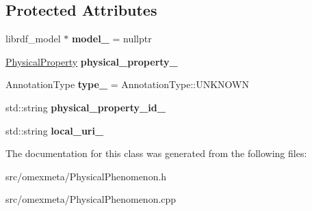 \subsection*{Protected Attributes}
\begin{DoxyCompactItemize}
\item 
\mbox{\label{classomexmeta_1_1PhysicalPhenomenon_a9de43fc3fd94d3463c7fb9b8f684e78b}} 
librdf\+\_\+model $\ast$ {\bfseries model\+\_\+} = nullptr
\item 
\mbox{\label{classomexmeta_1_1PhysicalPhenomenon_a9e17807d60d9e3f797d6c02ef85cdfc6}} 
\hyperlink{classomexmeta_1_1PhysicalProperty}{Physical\+Property} {\bfseries physical\+\_\+property\+\_\+}
\item 
\mbox{\label{classomexmeta_1_1PhysicalPhenomenon_a74e88adb2099099e411b55cb9aa460a0}} 
Annotation\+Type {\bfseries type\+\_\+} = Annotation\+Type\+::\+U\+N\+K\+N\+O\+WN
\item 
\mbox{\label{classomexmeta_1_1PhysicalPhenomenon_a41e8364977eea6d963a82f0f8088cb9a}} 
std\+::string {\bfseries physical\+\_\+property\+\_\+id\+\_\+}
\item 
\mbox{\label{classomexmeta_1_1PhysicalPhenomenon_a114864dfae1f79ce4e3f430b7711516c}} 
std\+::string {\bfseries local\+\_\+uri\+\_\+}
\end{DoxyCompactItemize}


The documentation for this class was generated from the following files\+:\begin{DoxyCompactItemize}
\item 
src/omexmeta/Physical\+Phenomenon.\+h\item 
src/omexmeta/Physical\+Phenomenon.\+cpp\end{DoxyCompactItemize}
